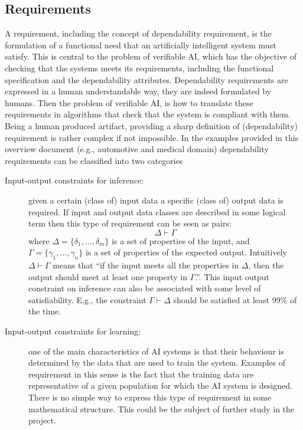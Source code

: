 
\subsection{Requirements}
A requirement, including the concept of dependability requirement, is the formulation of a functional need that an  artificially intelligent
system must satisfy. This is central to the problem of verifiable AI, which has the
objective of checking that the systems meets its
requirements, including the functional specification and the dependability attributes. 
Dependability requirements are expressed in a human understandable
way, they are indeed formulated by humans. Then the problem of
verifiable AI, is how to translate these requirements in algorithms
that check that the system is compliant with them. 
Being a human produced artifact, providing a sharp definition of
(dependability) requirement is rather complex if not impossible. In
the examples provided in this overview document (e.g., automotive and
medical domain) dependability requirements can be classified into two
categories 
\begin{description}
\item[Input-output constraints for inference:] given a certain (class of) input data
  a specific (class of) output data is required. If input and output
  data classes are described in some logical term then this type of
  requirement can be seen as pairs: 
$$
\Delta\vdash\Gamma 
$$
where $\Delta=\{\delta_1,\dots,\delta_m\}$ is a set of properties of
the input, and $\Gamma=\{\gamma_1,\dots,\gamma_n\}$ is a set of
properties of the expected output. Intuitively $ \Delta\vdash\Gamma $
means that ``if the input meets all the properties in $\Delta$, then
the output should meet at least one property in $\Gamma$.''.  This
input output constraint on inference can also be associated with some
level of satisfiability. E.g., the constraint $\Gamma\vdash\Delta$
should be satisfied at least 99\% of the time.

\item[Input-output constraints for learning:] one of the main
  characteristics of AI systems is that their behaviour is determined
  by the data that are used to train the system. Examples of
  requirement in this sense is the fact that the training data are
  representative of a given population for which the AI system is
  designed. There is no simple way to express this type of requirement
  in some mathematical structure. This could be the subject of further
  study in the project. 
\end{description}

